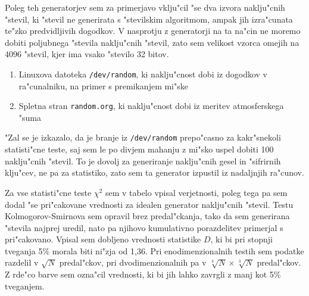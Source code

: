 \documentclass[a4paper,10pt]{article}
\begin{document}
Poleg teh generatorjev sem za primerjavo vklju"cil "se dva izvora naklju"cnih "stevil, ki "stevil ne generirata s "stevilskim algoritmom, ampak jih izra"cunata te"zko predvidljivih dogodkov. V nasprotju z generatorji na ta na"cin ne moremo dobiti poljubnega "stevila naklju"cnih "stevil, zato sem velikost vzorca omejih na 4096 "stevil, kjer ima vsako "stevilo 32 bitov.

\begin{enumerate}
 \item Linuxova datoteka \texttt{/dev/random}, ki naklju"cnost dobi iz dogodkov v ra"cunalniku, na primer s premikanjem mi"ske
 \item Spletna stran \texttt{random.org}, ki naklju"cnost dobi iz meritev atmosferskega "suma
\end{enumerate}

"Zal se je izkazalo, da je branje iz \texttt{/dev/random} prepo"casno za kakr"snekoli statisti"cne teste, saj sem le po divjem mahanju z mi"sko uspel dobiti 100 naklju"cnih "stevil. To je dovolj za generiranje naklju"cnih gesel in "sifrirnih klju"cev, ne pa za statistiko, zato sem ta generator izpustil iz nadaljnjih ra"cunov. 

Za vse statisti"cne teste $\chi^2$ sem v tabelo vpisal verjetnosti, poleg tega pa sem dodal "se pri"cakovane vrednosti za idealen generator naklju"cnih "stevil. Testu Kolmogorov-Smirnova sem opravil brez predal"ckanja, tako da sem generirana "stevila najprej uredil, nato pa njihovo kumulativno porazdelitev primerjal s pri"cakovano. Vpisal sem dobljeno vrednosti statistike $D$, ki bi pri stopnji tveganja 5\% morala biti ni"zja od 1,36. Pri enodimenzionalnih testih sem podatke razdelil v $\sqrt{N}$ predal"ckov, pri dvodimenzionalnih pa v $\sqrt[3]{N} \times \sqrt[3]{N}$ predal"ckov. Z rde"co barve sem ozna"cil vrednosti, ki bi jih lahko zavrgli z manj kot 5\% tveganjem. 
\end{document}
